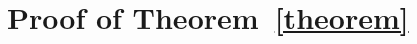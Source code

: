 \documentclass{article}
\def \vahid {\color{magenta}}
\begin{document}


\appendix

\section{Proof of Theorem~\ref{theorem}}
\label{sec:appendix_thoerem_nn_mu}
\end{document}
